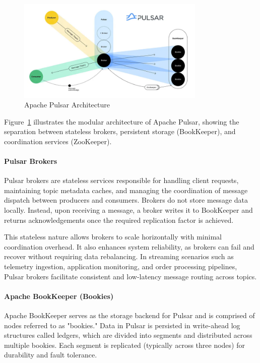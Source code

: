 \begin{figure}[H]
\centering
\includegraphics[width=0.8\textwidth]{SOA/pulsar.png}
\caption{Apache Pulsar Architecture}
\label{fig:pulsar_architecture}
\end{figure}

Figure~\ref{fig:pulsar_architecture} illustrates the modular architecture of Apache Pulsar, showing the separation between stateless brokers, persistent storage (BookKeeper), and coordination services (ZooKeeper).

\paragraph{Pulsar Brokers}
Pulsar brokers are stateless services responsible for handling client requests, maintaining topic metadata caches, and managing the coordination of message dispatch between producers and consumers. Brokers do not store message data locally. Instead, upon receiving a message, a broker writes it to BookKeeper and returns acknowledgements once the required replication factor is achieved.

This stateless nature allows brokers to scale horizontally with minimal coordination overhead. It also enhances system reliability, as brokers can fail and recover without requiring data rebalancing. In streaming scenarios such as telemetry ingestion, application monitoring, and order processing pipelines, Pulsar brokers facilitate consistent and low-latency message routing across topics.

\paragraph{Apache BookKeeper (Bookies)}
Apache BookKeeper serves as the storage backend for Pulsar and is comprised of nodes referred to as "bookies." Data in Pulsar is persisted in write-ahead log structures called ledgers, which are divided into segments and distributed across multiple bookies. Each segment is replicated (typically across three nodes) for durability and fault tolerance.


